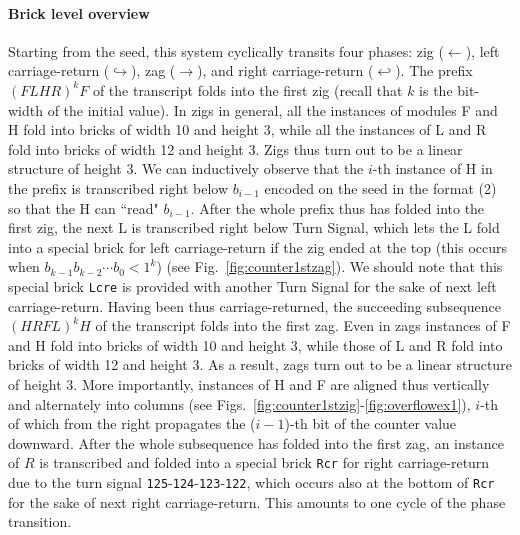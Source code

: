 \documentclass[twocolumn]{svjour3}
\begin{document}
\paragraph{Brick level overview}
Starting from the seed, this system cyclically transits four phases: zig ($\leftarrow$), left carriage-return ($\hookrightarrow$), zag ($\rightarrow$), and right carriage-return ($\hookleftarrow$). 
The prefix $(FLHR)^k F$ of the transcript folds into the first zig (recall that $k$ is the bit-width of the initial value). 
In zigs in general, all the instances of modules F and H fold into bricks of width 10 and height 3, while all the instances of  L and R fold into bricks of width 12 and height 3. 
Zigs thus turn out to be a linear structure of height 3. 
We can inductively observe that the $i$-th instance of H in the prefix is transcribed right below $b_{i-1}$ encoded on the seed in the format (2) so that the H can ``read" $b_{i-1}$. 
After the whole prefix thus has folded into the first zig, the next L is transcribed right below Turn Signal, which lets the L fold into a special brick for left carriage-return if the zig ended at the top (this occurs when $b_{k-1} b_{k-2} \cdots b_0 < 1^k$) (see Fig.~\ref{fig:counter1stzag}). 
We should note that this special brick \texttt{Lcre} is provided with another Turn Signal for the sake of next left carriage-return.
Having been thus carriage-returned, the succeeding subsequence $(HRFL)^k H$ of the transcript folds into the first zag.
Even in zags instances of F and H fold into bricks of width 10 and height 3, while those of L and R fold into bricks of width 12 and height 3. 
As a result, zags turn out to be a linear structure of height 3. 
More importantly, instances of H and F are aligned thus vertically and alternately into columns (see Figs.~\ref{fig:counter1stzig}-\ref{fig:overflowex1}), $i$-th of which from the right propagates the ($i{-}1$)-th bit of the counter value downward. 
After the whole subsequence has folded into the first zag, an instance of $R$ is transcribed and folded into a special brick \texttt{Rcr} for right carriage-return due to the turn signal \texttt{125}-\texttt{124}-\texttt{123}-\texttt{122}, which occurs also at the bottom of \texttt{Rcr} for the sake of next right carriage-return. 
This amounts to one cycle of the phase transition.
 

\end{document}
